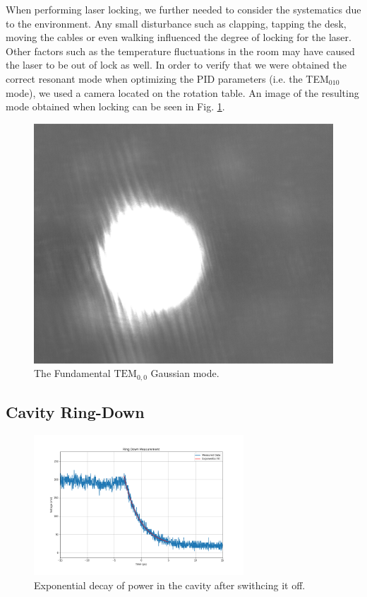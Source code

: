\documentclass[a4paper]{report}
\numberwithin{equation}{section}
\begin{document}
When performing laser locking, we further needed to consider the systematics due to the environment. 
Any small disturbance such as clapping, tapping the desk, moving the cables or even walking influenced the 
degree of locking for the laser. Other factors such as the temperature fluctuations in the room may have caused the 
laser to be out of lock as well. In order to verify that we were obtained the correct resonant mode when optimizing 
the PID parameters (i.e. the TEM$_{\mathrm{010}}$ mode), we used a camera located on the rotation table. An image of the 
resulting mode obtained when locking can be seen in Fig. \ref{fig:tem00-lock}. \par 


\begin{figure}[htpb]
    \centering
    \includegraphics[width=0.6\columnwidth]{tem00_lock}
    \caption{The Fundamental $\mathrm{TEM}_{0, 0}$ Gaussian mode.}
    \label{fig:tem00-lock}
\end{figure}	

\subsection{Cavity Ring-Down}

\begin{figure}[htpb]
    \centering
    \includegraphics[width=0.7\textwidth]{ring-down}
    \caption{Exponential decay of power in the cavity after swithcing it off.}
    \label{fig:ring-down}
\end{figure}
\end{document}
